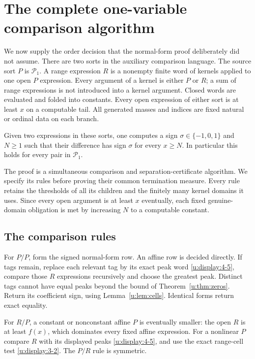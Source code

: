 \section{The complete one-variable comparison algorithm}
We now supply the order decision that the normal-form proof deliberately
did not assume. There are two sorts in the auxiliary comparison language.
The source sort $P$ is $\mathcal P_1$. A range expression $R$ is a
nonempty finite word of kernels applied to one open $P$ expression.
Every argument of a kernel is either $P$ or $R$; a sum of range expressions
is not introduced into a kernel argument. Closed words are evaluated and
folded into constants. Every open expression of either sort is at least
$x$ on a computable tail. All generated masses and indices are fixed
natural or ordinal data on each branch.

\begin{theorem}\label{u:thm:sign}
Given two expressions in these sorts, one computes a sign
$\sigma\in\{-1,0,1\}$ and $N\ge1$ such that their difference has sign
$\sigma$ for every $x\ge N$. In particular this holds for every pair in
$\mathcal P_1$.
\end{theorem}
The proof is a simultaneous comparison and separation-certificate algorithm.
We specify its rules before proving their common termination measure.
Every rule retains the thresholds of all its children and the finitely
many kernel domains it uses. Since every open argument is at least $x$
eventually, each fixed genuine-domain obligation is met by increasing
$N$ to a computable constant.

\subsection{The comparison rules}
For $P/P$, form the signed normal-form row. An affine row is decided
directly. If tags remain, replace each relevant tag by its exact peak
word \eqref{u:display:4-5}, compare those $R$ expressions recursively and choose the
greatest peak. Distinct tags cannot have equal peaks beyond the bound of
Theorem~\ref{u:thm:zeros}. Return its coefficient sign, using
Lemma~\ref{u:lem:cells}. Identical forms return exact equality.

For $R/P$, a constant or nonconstant affine $P$ is eventually smaller:
the open $R$ is at least $f(x)$, which dominates every fixed affine expression.
For a nonlinear $P$ compare $R$ with its displayed peaks \eqref{u:display:4-5}, and use
the exact range-cell test \eqref{u:display:3-2}. The $P/R$ rule is symmetric.

